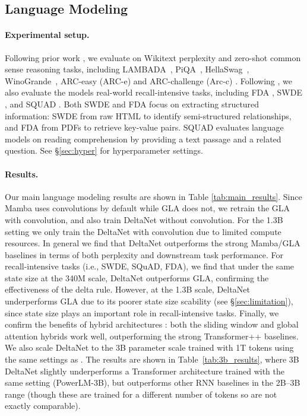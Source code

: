 \subsection{Language Modeling}
\label{sec:lm-exp}
\vspace{-2mm}
\paragraph{Experimental setup.} Following prior work \cite{gu_mamba_2023, yang_gated_2023}, we evaluate on Wikitext perplexity and
zero-shot common sense reasoning tasks, including LAMBADA~\citep[LMB.;][]{paperno_lambada_2016}, PiQA~\citep{bisk2020piqa}, HellaSwag~\citep[Hella.; ][]{zellers2019hellaswag}, WinoGrande~\citep[Wino.;][]{sakaguchi2021winogrande}, ARC-easy (ARC-e) and ARC-challenge (Arc-c) \citep{arc-ce}. Following \citet{arora_simple_2024}, we also evaluate the models real-world recall-intensive tasks, including FDA \cite{arora_language_2023}, SWDE \cite{lockard_openceres_2019}, and SQUAD \cite{rajpurkar_know_2018}. Both SWDE and FDA focus on extracting structured information: SWDE from raw HTML to identify semi-structured relationships, and FDA from PDFs to retrieve key-value pairs. SQUAD evaluates language models on reading comprehension by providing a text passage and a related question. See \S\ref{sec:hyper} for hyperparameter settings. 

\vspace{-2mm}




\vspace{-1mm}
\paragraph{Results.} Our main language modeling results are shown in Table \ref{tab:main_results}. Since Mamba uses convolutions by default while GLA does not, we retrain  the GLA with convolution, and also train DeltaNet without convolution. For the 1.3B setting we only train the DeltaNet with convolution due to limited compute resources. In general we find that DeltaNet outperforms the strong Mamba/GLA baselines in terms of both perplexity and downstream task performance. 
For recall-intensive tasks (i.e., SWDE, SQuAD, FDA), we find that under the same state size at the 340M scale, DeltaNet outperforms GLA, confirming the effectiveness of the delta rule. However, at the 1.3B scale, DeltaNet underperforms GLA due to its poorer state size scability (see \S\ref{sec:limitation}), since state size plays an important role in recall-intensive tasks.
Finally, we confirm the benefits of hybrid architectures \cite{de_griffin_2024,Lieber2024JambaAH}: both the sliding window and global attention hybrids work well, outperforming the strong Transformer++ baselines. 
We also scale DeltaNet to the 3B parameter scale trained with 1T tokens using the same settings as \citet{Shen2024PowerSA}. The results are shown in Table~\ref{tab:3b_results}, where 3B DeltaNet slightly underperforms a Transformer architecture trained with the same setting (PowerLM-3B), but outperforms  other  RNN baselines in the 2B--3B range (though these are trained for a different number of tokens so are not exactly comparable).


